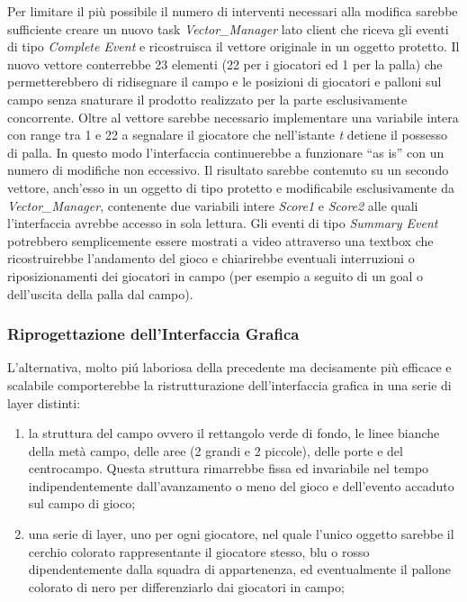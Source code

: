 \documentclass[aps,letterpaper,10pt]{article}
\begin{document}
Per limitare il pi\`u possibile il numero di interventi necessari alla modifica sarebbe sufficiente creare un nuovo task \emph{Vector\_Manager} lato client che riceva gli eventi di tipo \emph{Complete Event} e ricostruisca il vettore originale in un oggetto protetto. Il nuovo vettore conterrebbe 23 elementi (22 per i giocatori ed 1 per la palla) che permetterebbero di ridisegnare il campo e le posizioni di giocatori e palloni sul campo senza snaturare il prodotto realizzato per la parte esclusivamente concorrente. Oltre al vettore sarebbe necessario implementare una variabile intera con range tra 1 e 22 a segnalare il giocatore che nell'istante \emph{t} detiene il possesso di palla. In questo modo l'interfaccia continuerebbe a funzionare ``as is'' con un numero di modifiche non eccessivo. Il risultato sarebbe contenuto su un secondo vettore, anch'esso in un oggetto di tipo protetto e modificabile esclusivamente da \emph{Vector\_Manager}, contenente due variabili intere \emph{Score1} e \emph{Score2} alle quali l'interfaccia avrebbe accesso in sola lettura. Gli eventi di tipo \emph{Summary Event} potrebbero semplicemente essere mostrati a video attraverso una textbox che ricostruirebbe l'andamento del gioco e chiarirebbe eventuali interruzioni o riposizionamenti dei giocatori in campo (per esempio a seguito di un goal o dell'uscita della palla dal campo).

\subsubsection{Riprogettazione dell'Interfaccia Grafica} %
\label{ssub:riprogettazione_dell_interfaccia_grafica}

L'alternativa, molto pi\'u laboriosa della precedente ma decisamente pi\`u efficace e scalabile comporterebbe la ristrutturazione dell'interfaccia grafica in una serie di layer distinti:

\begin{enumerate}
	\item la struttura del campo ovvero il rettangolo verde di fondo, le linee bianche della met\`a campo, delle aree (2 grandi e 2 piccole), delle porte e del centrocampo. Questa struttura rimarrebbe fissa ed invariabile nel tempo indipendentemente dall'avanzamento o meno del gioco e dell'evento accaduto sul campo di gioco;
	\item una serie di layer, uno per ogni giocatore, nel quale l'unico oggetto sarebbe il cerchio colorato rappresentante il giocatore stesso, blu o rosso dipendentemente dalla squadra di appartenenza, ed eventualmente il pallone colorato di nero per differenziarlo dai giocatori in campo;
\end{enumerate}
\end{document}
